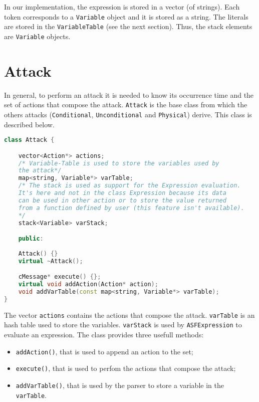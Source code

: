 In our implementation, the expression is stored in a vector (of strings). Each token corresponds to a \texttt{Variable} object and it is stored as a string. The literals are stored in the \texttt{VariableTable} (see the next section). Thus, the stack elements are \texttt{Variable} objects.

\section{Attack}
In general, to perform an attack it is needed to know its occurrence time and the set of actions that compose the attack. \texttt{Attack} is the base class from which the others attacks (\texttt{Conditional}, \texttt{Unconditional} and \texttt{Physical}) derive. This class is described below.
%
\begin{lstlisting}[language={cpp}]
class Attack {

	vector<Action*> actions;
	/* Variable-Table is used to store the variables used by 
	the attack*/
	map<string, Variable*> varTable;
	/* The stack is used as support for the Expression evaluation.
	It's here and not in the class Expression because its data 
	can be used in other action or to store the value returned 
	from a function defined by user (this feature isn't available).
	*/
	stack<Variable> varStack;

	public:
	  
	Attack() {}
   	virtual ~Attack();

	cMessage* execute() {};
	virtual void addAction(Action* action);
	void addVarTable(const map<string, Variable*> varTable);		
}
\end{lstlisting}

The vector \texttt{actions} contains the actions that compose the attack. \texttt{varTable} is an hash table used to store the variables. \texttt{varStack} is used by  \texttt{ASFExpression} to evaluate an expression. The class provides three usefull methods:
%
\begin{itemize}
\item \texttt{addAction()}, that is used to append an action to the set;
\item \texttt{execute()}, that is used to perfom the actions that compose the attack;
\item \texttt{addVarTable()}, that is used by the parser to store a variable in the \texttt{varTable}.
\end{itemize}


